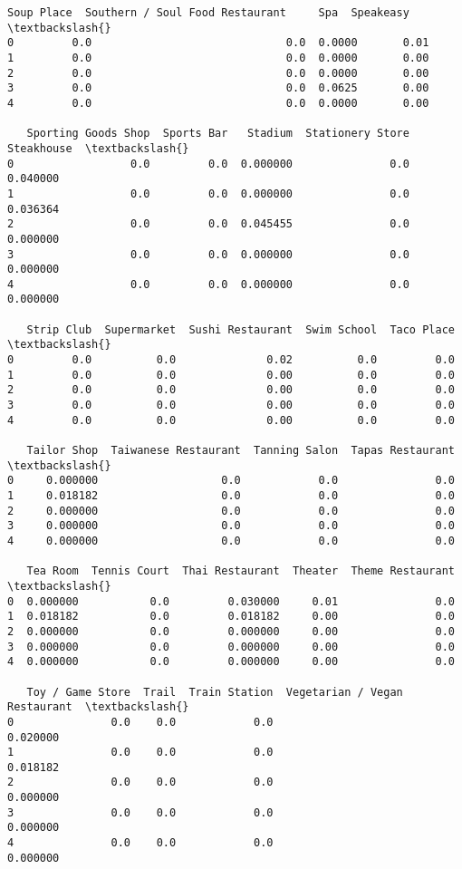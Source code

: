 \documentclass[11pt]{article}
\begin{document}
\begin{tcolorbox}[breakable, size=fbox, boxrule=.5pt, pad at break*=1mm, opacityfill=0]
\begin{Verbatim}[commandchars=\\\{\}]
   Soup Place  Southern / Soul Food Restaurant     Spa  Speakeasy  \textbackslash{}
0         0.0                              0.0  0.0000       0.01
1         0.0                              0.0  0.0000       0.00
2         0.0                              0.0  0.0000       0.00
3         0.0                              0.0  0.0625       0.00
4         0.0                              0.0  0.0000       0.00

   Sporting Goods Shop  Sports Bar   Stadium  Stationery Store  Steakhouse  \textbackslash{}
0                  0.0         0.0  0.000000               0.0    0.040000
1                  0.0         0.0  0.000000               0.0    0.036364
2                  0.0         0.0  0.045455               0.0    0.000000
3                  0.0         0.0  0.000000               0.0    0.000000
4                  0.0         0.0  0.000000               0.0    0.000000

   Strip Club  Supermarket  Sushi Restaurant  Swim School  Taco Place  \textbackslash{}
0         0.0          0.0              0.02          0.0         0.0
1         0.0          0.0              0.00          0.0         0.0
2         0.0          0.0              0.00          0.0         0.0
3         0.0          0.0              0.00          0.0         0.0
4         0.0          0.0              0.00          0.0         0.0

   Tailor Shop  Taiwanese Restaurant  Tanning Salon  Tapas Restaurant  \textbackslash{}
0     0.000000                   0.0            0.0               0.0
1     0.018182                   0.0            0.0               0.0
2     0.000000                   0.0            0.0               0.0
3     0.000000                   0.0            0.0               0.0
4     0.000000                   0.0            0.0               0.0

   Tea Room  Tennis Court  Thai Restaurant  Theater  Theme Restaurant  \textbackslash{}
0  0.000000           0.0         0.030000     0.01               0.0
1  0.018182           0.0         0.018182     0.00               0.0
2  0.000000           0.0         0.000000     0.00               0.0
3  0.000000           0.0         0.000000     0.00               0.0
4  0.000000           0.0         0.000000     0.00               0.0

   Toy / Game Store  Trail  Train Station  Vegetarian / Vegan Restaurant  \textbackslash{}
0               0.0    0.0            0.0                       0.020000
1               0.0    0.0            0.0                       0.018182
2               0.0    0.0            0.0                       0.000000
3               0.0    0.0            0.0                       0.000000
4               0.0    0.0            0.0                       0.000000


\end{Verbatim}
\end{tcolorbox}
\end{document}
